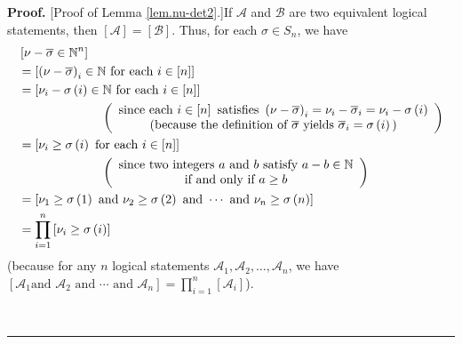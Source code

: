\documentclass
[numbers=enddot,12pt,final,onecolumn,notitlepage,english]{scrartcl}%
\theoremstyle{definition}
\newenvironment{proof}[1][Proof]{\noindent\textbf{#1.} }{\ \rule{0.5em}{0.5em}}
\let\prodnonlimits\prod
\renewcommand{\prod}{\prodnonlimits\limits}
\newenvironment{vershort}{}{}
\begin{document}
\begin{vershort}
\begin{proof}
[Proof of Lemma \ref{lem.nu-det2}.]If $\mathcal{A}$ and $\mathcal{B}$ are two
equivalent logical statements, then $\left[  \mathcal{A}\right]  =\left[
\mathcal{B}\right]  $. Thus, for each $\sigma\in S_{n}$, we have%
\begin{align}
&  \left[  \nu-\overline{\sigma}\in\mathbb{N}^{n}\right] \nonumber\\
&  =\left[  \left(  \nu-\overline{\sigma}\right)  _{i}\in\mathbb{N}\text{ for
each }i\in\left[  n\right]  \right] \nonumber\\
&  =\left[  \nu_{i}-\sigma\left(  i\right)  \in\mathbb{N}\text{ for each }%
i\in\left[  n\right]  \right] \nonumber\\
&  \ \ \ \ \ \ \ \ \ \ \ \ \ \ \ \ \ \ \ \ \left(
\begin{array}
[c]{c}%
\text{since each }i\in\left[  n\right]  \text{ satisfies }\left(
\nu-\overline{\sigma}\right)  _{i}=\nu_{i}-\overline{\sigma}_{i}=\nu
_{i}-\sigma\left(  i\right) \\
\text{(because the definition of }\overline{\sigma}\text{ yields }%
\overline{\sigma}_{i}=\sigma\left(  i\right)  \text{)}%
\end{array}
\right) \nonumber\\
&  =\left[  \nu_{i}\geq\sigma\left(  i\right)  \text{ for each }i\in\left[
n\right]  \right] \nonumber\\
&  \ \ \ \ \ \ \ \ \ \ \ \ \ \ \ \ \ \ \ \ \left(
\begin{array}
[c]{c}%
\text{since two integers }a\text{ and }b\text{ satisfy }a-b\in\mathbb{N}\\
\text{if and only if }a\geq b
\end{array}
\right) \nonumber\\
&  =\left[  \nu_{1}\geq\sigma\left(  1\right)  \text{ and }\nu_{2}\geq
\sigma\left(  2\right)  \text{ and }\cdots\text{ and }\nu_{n}\geq\sigma\left(
n\right)  \right] \nonumber\\
&  =\prod_{i=1}^{n}\left[  \nu_{i}\geq\sigma\left(  i\right)  \right]
\label{pf.lem.nu-det2.short.ive}%
\end{align}
(because for any $n$ logical statements $\mathcal{A}_{1},\mathcal{A}%
_{2},\ldots,\mathcal{A}_{n}$, we have \newline$\left[  \mathcal{A}_{1}\text{
and }\mathcal{A}_{2}\text{ and }\cdots\text{ and }\mathcal{A}_{n}\right]
=\prod_{i=1}^{n}\left[  \mathcal{A}_{i}\right]  $).


\end{proof}
\end{vershort}
\end{document}
